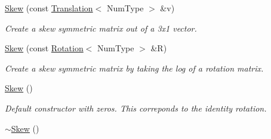 \begin{DoxyCompactItemize}
\item 
\hyperlink{singletonscrews_1_1_skew_a1da0cff5c4f0dc9c5b75816d2d7d0253}{Skew} (const \hyperlink{singletonscrews_1_1_translation}{Translation}$<$ Num\+Type $>$ \&v)
\begin{DoxyCompactList}\small\item\em Create a skew symmetric matrix out of a 3x1 vector. \end{DoxyCompactList}\item 
\hyperlink{singletonscrews_1_1_skew_a973f5bedca322ee41e2bcc775d9a8221}{Skew} (const \hyperlink{singletonscrews_1_1_rotation}{Rotation}$<$ Num\+Type $>$ \&R)
\begin{DoxyCompactList}\small\item\em Create a skew symmetric matrix by taking the log of a rotation matrix. \end{DoxyCompactList}\item 
\hypertarget{singletonscrews_1_1_skew_adfbcd45cb6a3fcd6ab46e4a241bc0f5e}{\hyperlink{singletonscrews_1_1_skew_adfbcd45cb6a3fcd6ab46e4a241bc0f5e}{Skew} ()}\label{singletonscrews_1_1_skew_adfbcd45cb6a3fcd6ab46e4a241bc0f5e}

\begin{DoxyCompactList}\small\item\em Default constructor with zeros. This correponds to the identity rotation. \end{DoxyCompactList}\item 
\hypertarget{singletonscrews_1_1_skew_a1ee1b94645099f859b121dca035e8b97}{\hyperlink{singletonscrews_1_1_skew_a1ee1b94645099f859b121dca035e8b97}{$\sim$\+Skew} ()}\label{singletonscrews_1_1_skew_a1ee1b94645099f859b121dca035e8b97}


\end{DoxyCompactItemize}
